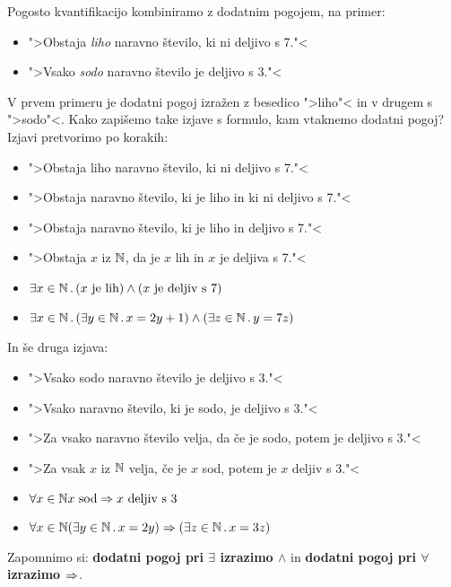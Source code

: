 Pogosto kvantifikacijo kombiniramo z dodatnim pogojem, na primer:
%
\begin{itemize}
\item ">Obstaja \emph{liho} naravno število, ki ni deljivo s 7."<
\item ">Vsako \emph{sodo} naravno število je deljivo s 3."<
\end{itemize}
%
V prvem primeru je dodatni pogoj izražen z besedico ">liho"< in v drugem s ">sodo"<. Kako zapišemo take izjave s formulo, kam
vtaknemo dodatni pogoj? Izjavi pretvorimo po korakih:
%
\begin{itemize}
\item ">Obstaja liho naravno število, ki ni deljivo s 7."<
\item ">Obstaja naravno število, ki je liho in ki ni deljivo s 7."<
\item ">Obstaja naravno število, ki je liho in deljivo s 7."<
\item ">Obstaja $x$ iz $\mathbb{N}$, da je $x$ lih in $x$ je deljiva s 7."<
\item $\exists x \in \mathbb{N} \,.\, (\text{$x$ je lih}) \land (\text{$x$ je deljiv s 7})$
\item $\exists x \in \mathbb{N} \,.\, (\exists y \in \mathbb{N} \,.\, x = 2 y + 1) \land (\exists z \in \mathbb{N} \,.\, y = 7 z)$
\end{itemize}
%
In še druga izjava:
\begin{itemize}
\item ">Vsako sodo naravno število je deljivo s 3."<
\item ">Vsako naravno število, ki je sodo, je deljivo s 3."<
\item ">Za vsako naravno število velja, da če je sodo, potem je deljivo s 3."<
\item ">Za vsak $x$ iz $\mathbb{N}$ velja, če je $x$ sod, potem je $x$ deljiv s $3$."<
\item $\forall{x \in \mathbb{N}} \text{$x$ sod} \Rightarrow \text{$x$ deljiv s 3}$
\item $\forall{x \in \mathbb{N}} (\exists y \in \mathbb{N} \,.\, x = 2 y) \Rightarrow (\exists z \in \mathbb{N} \,.\, x = 3 z)$
\end{itemize}
%
Zapomnimo si: \textbf{dodatni pogoj pri $\exists$ izrazimo $\land$} in \textbf{dodatni pogoj pri $\forall$ izrazimo $\Rightarrow$}.

